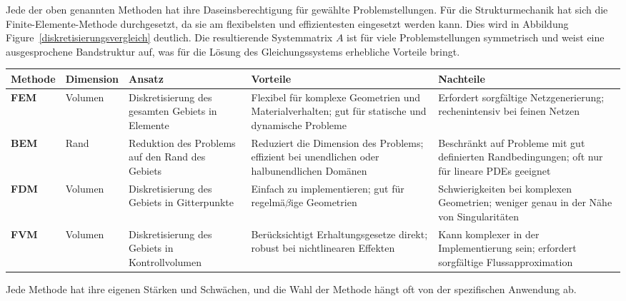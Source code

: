 Jede der oben genannten Methoden hat ihre Daseinsberechtigung für gewählte Problemstellungen. Für die Strukturmechanik hat sich die Finite-Elemente-Methode durchgesetzt, da sie am flexibelsten und effizientesten eingesetzt werden kann. Dies wird in Abbildung Figure~\ref{diskretisierungsvergleich} deutlich. Die resultierende Systemmatrix $A$ ist für viele Problemstellungen symmetrisch und weist eine ausgesprochene Bandstruktur auf, was für die Lösung des Gleichungssystems erhebliche Vorteile bringt.

\bigskip\noindent
\begin{tabular}{p{}p{}p{}p{}p{}}
\toprule
Methode & Dimension & Ansatz & Vorteile & Nachteile \\
\hline
\textbf{FEM} & Volumen & Diskretisierung des gesamten Gebiets in Elemente & Flexibel für komplexe Geometrien und Materialverhalten; gut für statische und dynamische Probleme & Erfordert sorgfältige Netzgenerierung; rechenintensiv bei feinen Netzen \\
\textbf{BEM} & Rand & Reduktion des Problems auf den Rand des Gebiets & Reduziert die Dimension des Problems; effizient bei unendlichen oder halbunendlichen Domänen & Beschränkt auf Probleme mit gut definierten Randbedingungen; oft nur für lineare PDEs geeignet \\
\textbf{FDM} & Volumen & Diskretisierung des Gebiets in Gitterpunkte & Einfach zu implementieren; gut für regelmä$\beta$ige Geometrien & Schwierigkeiten bei komplexen Geometrien; weniger genau in der Nähe von Singularitäten \\
\textbf{FVM} & Volumen & Diskretisierung des Gebiets in Kontrollvolumen & Berücksichtigt Erhaltungsgesetze direkt; robust bei nichtlinearen Effekten & Kann komplexer in der Implementierung sein; erfordert sorgfältige Flussapproximation \\
\bottomrule
\end{tabular}

\bigskip Jede Methode hat ihre eigenen Stärken und Schwächen, und die Wahl der Methode hängt oft von der spezifischen Anwendung ab.



